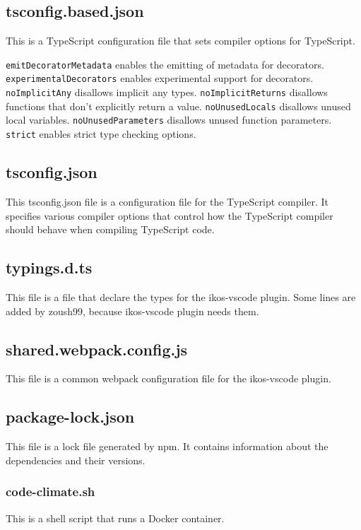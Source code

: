\documentclass[12pt]{article}
\begin{document}
\subsection{tsconfig.based.json}
This is a TypeScript configuration file that sets compiler options for TypeScript.

\texttt{emitDecoratorMetadata} enables the emitting of metadata for decorators.
\texttt{experimentalDecorators} enables experimental support for decorators.
\texttt{noImplicitAny} disallows implicit any types.
\texttt{noImplicitReturns} disallows functions that don't explicitly return a value.
\texttt{noUnusedLocals} disallows unused local variables.
\texttt{noUnusedParameters} disallows unused function parameters.
\texttt{strict} enables strict type checking options.

\subsection{tsconfig.json}
This tsconfig.json file is a configuration file for the TypeScript compiler. It specifies various compiler options that control how the TypeScript compiler should behave when compiling TypeScript code.

\subsection{typings.d.ts}
This file is a file that declare the types for the ikos-vscode plugin. Some lines are added by zoush99, because ikos-vscode plugin needs them.

\subsection{shared.webpack.config.js}
This file is a common webpack configuration file for the ikos-vscode plugin.

\subsection{package-lock.json}
This file is a lock file generated by npm. It contains information about the dependencies and their versions.

\subsubsection{code-climate.sh}
This is a shell script that runs a Docker container. 
\end{document}
